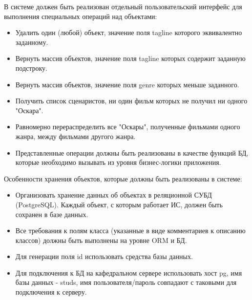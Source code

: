 \documentclass[12pt,a4paper]{article}
\begin{document}
В системе должен быть реализован отдельный пользовательский интерфейс для выполнения специальных операций над объектами:


\begin{itemize}[leftmargin=*]

\item Удалить один (любой) объект, значение поля tagline которого эквивалентно заданному.

\item Вернуть массив объектов, значение поля tagline которых содержит заданную подстроку.

\item Вернуть массив объектов, значение поля genre которых меньше заданного.

\item Получить список сценаристов, ни один фильм которых не получил ни одного "Оскара".

\item Равномерно перераспределить все "Оскары", полученные фильмами одного жанра, между фильмами другого жанра.

\item Представленные операции должны быть реализованы в качестве функций БД, которые необходимо вызывать из уровня бизнес-логики приложения.

\end{itemize}

Особенности хранения объектов, которые должны быть реализованы в системе:


\begin{itemize}[leftmargin=*]

\item Организовать хранение данных об объектах в реляционной СУБД (PostgreSQL). Каждый объект, с которым работает ИС, должен быть сохранен в базе данных.

\item Все требования к полям класса (указанные в виде комментариев к описанию классов) должны быть выполнены на уровне ORM и БД.

\item Для генерации поля id использовать средства базы данных.

\item Для подключения к БД на кафедральном сервере использовать хост pg, имя базы данных - studs, имя пользователя/пароль совпадают с таковыми для подключения к серверу.

\end{itemize}
\end{document}
